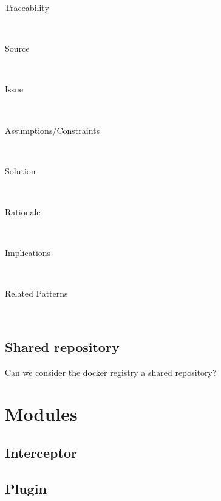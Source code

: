 \begin{description}
\item [Traceability]~\\


\item [Source]~\\


\item [Issue]~\\


\item [Assumptions/Constraints]~

\item [Solution]~


\item [Rationale] ~\\

\item [Implications]~\\


\item [Related Patterns]~\\


\end{description}

\subsection{Shared repository}
Can we consider the docker registry a shared repository?




\section{Modules}
\subsection{Interceptor}
\subsection{Plugin}


